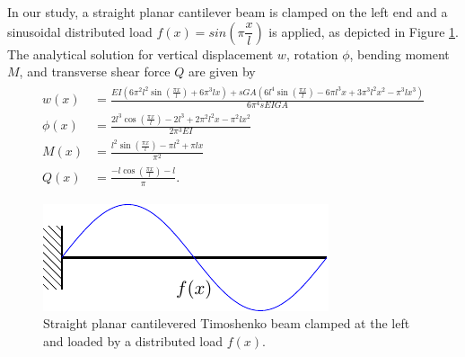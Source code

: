 In our study, a straight planar cantilever beam is clamped on the left end and a sinusoidal distributed load $f(x)=sin(\pi\dfrac{x}{l})$ is applied, as depicted in Figure \ref{fig:load_beam}. The analytical solution for vertical displacement $w$, rotation $\phi$, bending moment $M$, and transverse shear force $Q$ are given by
\begin{align}
    \begin{split}
        w(x)&=\frac{EI\left(6 \pi ^2 l^2 \sin \left(\frac{\pi  x}{l}\right)+6 \pi ^3 l x\right)+sGA\left(6 l^4 \sin \left(\frac{\pi  x}{l}\right)-6 \pi l^3 x+3 \pi ^3 l^2 x^2-\pi ^3 l x^3\right)}{6 \pi ^4 sEIGA}\\
        \phi(x)&=\frac{2 l^3 \cos \left(\frac{\pi  x}{l}\right)-2 l^3+2 \pi ^2 l^2 x-\pi ^2 l x^2}{2 \pi ^3 EI}\\
        M(x)&=\frac{l^2 \sin \left(\frac{\pi  x}{l}\right)-\pi  l^2+\pi  l x}{\pi ^2}\\
        Q(x)&=\frac{-l\cos \left(\frac{\pi  x}{l}\right)-l}{\pi}.
    \end{split}
    \label{eq:timoshenko_analytical}
\end{align}
\begin{figure}[h]
    \centering
    \includegraphics[width=0.4\linewidth]{beam_load}
    \caption{Straight planar cantilevered Timoshenko beam clamped at the left and loaded by a distributed load $f(x)$.}
    \label{fig:load_beam}
\end{figure}

